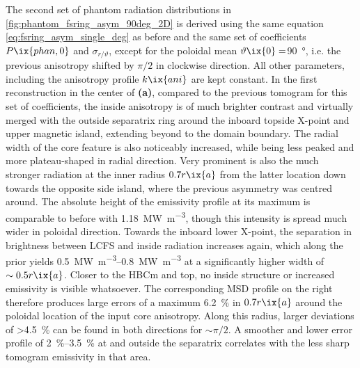                 The second set of phantom radiation distributions in \cref{fig:phantom_fsring_asym_90deg_2D} is derived using the same equation \ref{eq:fsring_asym_single_deg} as before and the same set of coefficients $P\ix{phan,0}$ and $\sigma_{r/\vartheta}$, except for the poloidal mean $\vartheta\ix{0}=$\SI{90}{\degree}, i.e. the previous anisotropy shifted by $\pi/2$ in clockwise direction. All other parameters, including the anisotropy profile $k\ix{ani}$ are kept constant. In the first reconstruction in the center of \textbf{(a)}, compared to the previous tomogram for this set of coefficients, the inside anisotropy is of much brighter contrast and virtually merged with the outside separatrix ring around the inboard topside X-point and upper magnetic island, extending beyond to the domain boundary. The radial width of the core feature is also noticeably increased, while being less peaked and more plateau-shaped in radial direction. Very prominent is also the much stronger radiation at the inner radius $0.7r\ix{a}$ from the latter location down towards the opposite side island, where the previous asymmetry was centred around. The absolute height of the emissivity profile at its maximum is comparable to before with \SI{1.18}{\mega\watt\per\cubic\meter}, though this intensity is spread much wider in poloidal direction. Towards the inboard lower X-point, the separation in brightness between LCFS and inside radiation increases again, which along the prior yields \SIrange{0.5}{0.8}{\mega\watt\per\cubic\meter} at a significantly higher width of $\sim0.5r\ix{a}$. Closer to the HBCm and top, no inside structure or increased emissivity is visible whatsoever. The corresponding MSD profile on the right therefore produces large errors of a maximum \SI{6.2}{\percent} in $0.7r\ix{a}$ around the poloidal location of the input core anisotropy. Along this radius, larger deviations of >\SI{4.5}{\percent} can be found in both directions for $\sim\pi/2$. A smoother and lower error profile of \SIrange{2}{3.5}{\percent} at and outside the separatrix correlates with the less sharp tomogram emissivity in that area.\\%
